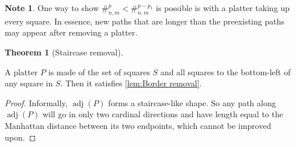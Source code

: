 \documentclass{article}
\theoremstyle{definition}%
\newtheorem{theorem}{Theorem}[section]
\newtheorem{lemma}[theorem]{Lemma}
\newtheorem*{note}{Note}
\newcommand{\adj}{\operatorname{adj}}
\begin{document}
\begin{note}
One way to show $\#^{p}_{n, m} < \#^{p - p_1}_{n, m}$ is possible is with a platter taking up every square. In essence, new paths that are longer than the preexisting paths may appear after removing a platter.
\end{note}

%
%
%
%
%

\begin{theorem}[Staircase removal]
\label{th:Staircase removal}

A platter $P$ is made of the set of squares $S$ and all squares to the bottom-left of any square in $S$. Then it satisfies \cref{lem:Border removal}.
\end{theorem}

\begin{proof}
Informally, $\adj(P)$ forms a staircase-like shape. So any path along $\adj(P)$ will go in only two cardinal directions and have length equal to the Manhattan distance between its two endpoints, which cannot be improved upon.
\end{proof}
\end{document}
